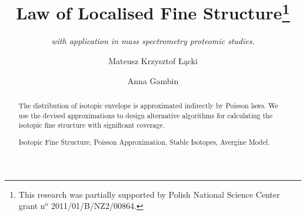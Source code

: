 \documentclass[runningheads,a4paper]{llncs}
\newcommand{\keywords}[1]{\par\addvspace\baselineskip
\noindent\keywordname\enspace\ignorespaces#1}
\begin{document}
\mainmatter  

\title{Law of Localised Fine Structure\thanks{
	This research was partially supported by Polish National Science Center grant $\text{n}^\text{o}$ 2011/01/B/NZ2/00864.
}}

\subtitle{\textit{with application in mass spectrometry proteomic studies.}}


\author{Mateusz Krzysztof \L\k{a}cki
\and Anna Gambin}





\maketitle

\begin{abstract}
  The distribution of isotopic envelope is approximated indirectly by Poisson laws. We use the devised approximations to design alternative algorithms for calculating the isotopic fine structure with significant coverage. 
\keywords{Isotopic Fine Structure, Poisson Approximation, Stable Isotopes, Avergine Model.}
\end{abstract}









  
  




\end{document}
